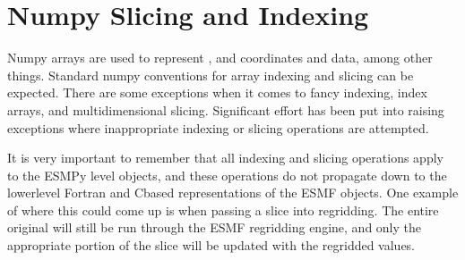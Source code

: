 \documentclass[letterpaper,10pt,english]{sphinxmanual}
\begin{document}
\section{Numpy Slicing and Indexing}
\label{\detokenize{api:numpy-slicing-and-indexing}}
Numpy arrays are used to represent {\hyperref[\detokenize{grid:ESMF.api.grid.Grid}]{}}, {\hyperref[\detokenize{mesh:ESMF.api.mesh.Mesh}]{}} and {\hyperref[\detokenize{locstream:ESMF.api.locstream.LocStream}]{}} coordinates and {\hyperref[\detokenize{field:ESMF.api.field.Field}]{}} data,
among other things.  Standard numpy conventions for array indexing
and slicing can be expected.  There are some exceptions when it comes to fancy
indexing, index arrays, and multi\sphinxhyphen{}dimensional slicing.  Significant effort has
been put into raising exceptions where inappropriate indexing or slicing
operations are attempted.

It is very important to remember that all indexing
and slicing operations apply  to the ESMPy level objects, and these operations
do not propagate down to the lower\sphinxhyphen{}level Fortran\sphinxhyphen{} and C\sphinxhyphen{}based representations
of the ESMF objects.  One example of where this could come up is when passing
a {\hyperref[\detokenize{field:ESMF.api.field.Field}]{}} slice into regridding.  The entire original {\hyperref[\detokenize{field:ESMF.api.field.Field}]{}} will still be run
through the ESMF regridding engine, and only the appropriate portion of
the {\hyperref[\detokenize{field:ESMF.api.field.Field}]{}} slice will be updated with the regridded values.
\end{document}
